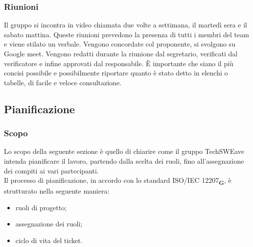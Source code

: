 \subsubsection{Riunioni}
Il gruppo si incontra in video chiamata due volte a settimana, il martedì sera e il sabato mattina. Queste riunioni prevedono la presenza di tutti i membri del team e viene stilato un verbale.
Vengono concordate col proponente, si svolgono su Google meet.
Vengono redatti durante la riunione dal segretario, verificati dal verificatore e infine approvati dal responsabile. \`E importante che siano il più concisi possibile e possibilmente riportare quanto è stato detto in elenchi o tabelle, di facile e veloce consultazione.
\subsection{Pianificazione}
\subsubsection{Scopo}
Lo scopo della seguente sezione è quello di chiarire come il gruppo TechSWEave intenda pianificare il lavoro, partendo dalla scelta dei ruoli, fino all'assegnazione dei compiti ai vari partecipanti.\\
Il processo di pianificazione, in accordo con lo standard ISO/IEC 12207\textsubscript{\textbf{G}}, è strutturato nella seguente maniera:
\begin {itemize}
\item ruoli di progetto;
\item assegnazione dei ruoli;
\item ciclo di vita del ticket.
\end {itemize}
